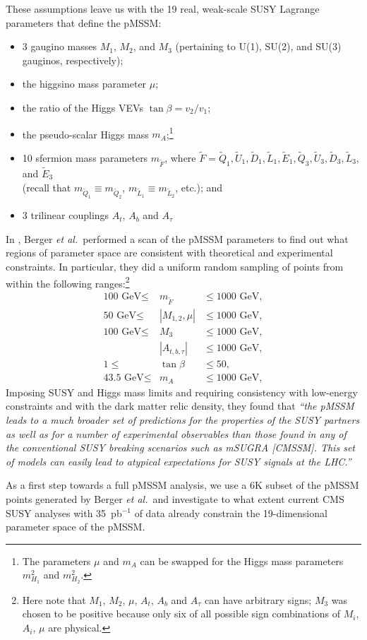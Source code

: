 These assumptions leave us with the 19 real, weak-scale SUSY Lagrange parameters 
that define the pMSSM:
\begin{itemize}
   \item 3 gaugino masses $M_1$, $M_2$, and $M_3$ 
         (pertaining to U(1), SU(2), and SU(3) gauginos, respectively);         
   \item the higgsino mass parameter $\mu$;
   \item the ratio of the Higgs VEVs $\tan\beta=v_2/v_1$;
   \item the pseudo-scalar Higgs mass $m_A$;\footnote{The parameters $\mu$ and $m_A$  
         can be swapped for the Higgs mass parameters $m_{H_1}^2$ and $m_{H_2}^2$.}
   \item 10 sfermion mass parameters $m_{\tilde{F}}$, where 
         $\tilde{F} = \tilde{Q}_1, \tilde{U}_1, \tilde{D}_1, 
                      \tilde{L}_1, \tilde{E}_1, 
                      \tilde{Q}_3, \tilde{U}_3, \tilde{D}_3, 
                      \tilde{L}_3$, and $\tilde{E}_3$ \\ 
(recall that $m_{\tilde{Q}_1}\equiv m_{\tilde{Q}_2}$, 
           $m_{\tilde{L}_1}\equiv m_{\tilde{L}_2}$, etc.); and          
   \item 3 trilinear couplings $A_t$, $A_b$ and $A_\tau$                  
\end{itemize}
 
In \cite{Berger:2008cq}, Berger {\it et al.}\ performed a scan of the pMSSM parameters  
to find out what regions of parameter space are consistent with theoretical and experimental constraints. In particular, they did a uniform random sampling of 
points from within the following ranges:\footnote{Here note that $M_1$, $M_2$, 
$\mu$, $A_t$, $A_b$ and $A_\tau$ can have 
arbitrary signs; $M_3$ was chosen to be positive because only six 
of all possible sign combinations of $M_i$, $A_i$, $\mu$ are physical.} 
\begin{eqnarray}
  \mbox{100 GeV} \leq 	& m_{\tilde{F}}  & \leq \mbox{1000 GeV},   \nonumber \\
  \mbox{50 GeV}  \leq	& |M_{1,2},\mu|  & \leq \mbox{1000 GeV}, 	 \nonumber \\
  \mbox{100 GeV} \leq	& M_3 	     & \leq \mbox{1000 GeV},   \\
	                  & |A_{t,b,\tau}| & \leq \mbox{1000 GeV}, 	 \nonumber \\
    1  \leq			& \tan\beta		& \leq 50,	  \nonumber \\
    \mbox{43.5 GeV}	\leq	& m_A			& \leq \mbox{1000 GeV},  \nonumber 
\end{eqnarray}
Imposing SUSY and Higgs mass limits and requiring consistency with low-energy 
constraints and with the dark matter relic density, 
they found \cite{Berger:2008cq} that 
{\it ``the pMSSM leads to a much broader set of predictions for the properties 
of the SUSY partners as well as for a number of experimental observables than 
those found in any of the conventional SUSY breaking scenarios such as mSUGRA [CMSSM]. This set of models can easily lead to atypical expectations for SUSY signals 
at the LHC.''}

As a first step towards a full pMSSM analysis, we use a 6K subset of the 
pMSSM points generated by Berger {\it et al.}\ and investigate to what
extent current CMS SUSY analyses with 35~pb$^{-1}$ of data already constrain the 
19-dimensional parameter space of the pMSSM.
